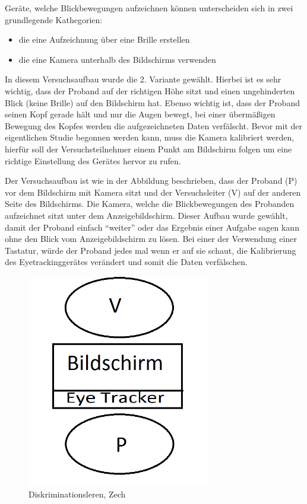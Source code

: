 Geräte, welche Blickbewegungen aufzeichnen können unterscheiden sich in zwei grundlegende Kathegorien:
    \begin{itemize}
        \item die eine Aufzeichnung über eine Brille erstellen
        \item die eine Kamera unterhalb des Bildschirms verwenden
    \end{itemize}


In diesem Versuchsaufbau wurde die 2. Variante gewählt. Hierbei ist es sehr wichtig, dass der Proband auf der richtigen Höhe sitzt und einen ungehinderten Blick (keine Brille) auf den Bildschirm hat. Ebenso wichtig ist, dass der Proband seinen Kopf gerade hält und nur die Augen bewegt, bei einer übermäßigen Bewegung des Kopfes werden die aufgezeichneten Daten verfälscht. Bevor mit der eigentlichen Studie begonnen werden kann, muss die Kamera kalibriert werden, hierfür soll der Versuchsteilnehmer einem Punkt am Bildschirm folgen um eine richtige Einstellung des Gerätes hervor zu rufen. 

Der Versuchsaufbau ist wie in der Abbildung beschrieben, dass der Proband (P) vor dem Bildschirm mit Kamera sitzt und der Versuchsleiter (V) auf der anderen Seite des Bildschirms. Die Kamera, welche die Blickbewegungen des Probanden aufzeichnet sitzt unter dem Anzeigebildschirm. Dieser Aufbau wurde gewählt, damit der Proband einfach ``weiter'' oder das Ergebnis einer Aufgabe sagen kann ohne den Blick vom Anzeigebildschirm zu lösen. Bei einer der Verwendung einer Tastatur, würde der Proband jedes mal wenn er auf sie schaut, die Kalibrierung des Eyetrackinggerätes verändert und somit die Daten verfälschen. 

\begin{figure}[!ht]
\noindent\hspace{0.5mm}\includegraphics[width=8cm]{./Ressourcen/Versuchsaufbau.png}
\caption{Diskriminationsleren, Zech}
\end{figure}

